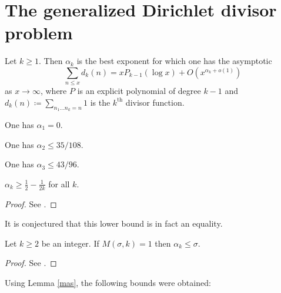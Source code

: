 \chapter{The generalized Dirichlet divisor problem}

\begin{definition}\label{divisor-def} Let $k \geq 1$. Then $\alpha_k$ is the best exponent for which one has the asymptotic
$$ \sum_{n \leq x} d_k(n) = x P_{k-1}(\log x) + O(x^{\alpha_k+o(1)})$$
as $x \to \infty$, where $P$ is an explicit polynomial of degree $k-1$ and $d_k(n) \coloneqq \sum_{n_1 \dots n_k=n} 1$ is the $k^{\mathrm{th}}$ divisor function.
\end{definition}

\begin{lemma}[$d_1$ exponent]\label{divisor-1} One has $\alpha_1=0$.
\end{lemma}

\begin{lemma}\label{divisor-2-bound}\cite[Theorem 13.1]{ivic} One has $\alpha_2 \leq 35/108$.
\end{lemma}

\begin{lemma}\label{divisor-kolesnik}\cite{kolesnik} One has $\alpha_3 \leq 43/96$.
\end{lemma}


\begin{lemma}\label{divisor-lower} $\alpha_k \geq \frac{1}{2} - \frac{1}{2k}$ for all $k$.
\end{lemma}

\begin{proof} See \cite{hardy_divisor_1916, szego-walfisz-I, szego-walfisz-II}.
\end{proof}

It is conjectured that this lower bound is in fact an equality.

\begin{lemma}\label{mas}  Let $k \geq 2$ be an integer. If $M(\sigma,k) = 1$ then $\alpha_k \leq \sigma$.
\end{lemma}

\begin{proof}  See \cite[\S 13.3]{ivic}.
\end{proof}

Using Lemma \ref{mas}, the following bounds were obtained:

